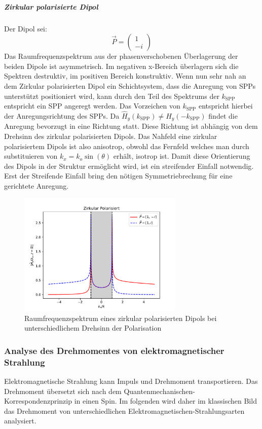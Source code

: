 \documentclass[titlepage]{article}
\begin{document}
		\subparagraph{Zirkular polarisierte Dipol}
			Der Dipol sei:
			$$\vec{P} = \begin{pmatrix} 1 \\ -i\end{pmatrix}$$
			Das Raumfrequenzspektrum aus der phasenverschobenen Überlagerung der beiden Dipole ist asymmetrisch. Im negativen x-Bereich überlagern sich die Spektren destruktiv, im positiven Bereich konstruktiv. Wenn nun sehr nah an dem Zirkular polarisierten Dipol ein Schichtsystem, dass die Anregung von SPPs unterstützt positioniert wird, kann durch den Teil des Spektrums der $k_{\mathrm{SPP}}$ entspricht ein SPP angeregt werden. Das Vorzeichen von $k_{\mathrm{SPP}}$ entspricht hierbei der Anregungsrichtung des SPPs. Da $\hat{H}_y(k_{\mathrm{SPP}}) \neq \hat{H}_y( -k_{\mathrm{SPP}}) $ findet die Anregung bevorzugt in eine Richtung statt. Diese Richtung ist abhängig von dem Drehsinn des zirkular polarisierten Dipols.			
			Das Nahfeld eine zirkular polarisiertem Dipols ist also anisotrop, obwohl das Fernfeld welches man durch substituieren von $k_x = k_o \sin(\theta)$ erhält, isotrop ist. Damit diese Orientierung des Dipols in der Struktur ermöglicht wird, ist ein streifender Einfall notwendig. Erst der Streifende Einfall bring den nötigen Symmetriebrechung für eine gerichtete Anregung.
		\begin{figure}[h]
			\centering
			\includegraphics[width=0.7\textwidth]{figures/spatial_spectrum_circ.pdf}
			\caption{Raumfrequenzspektrum eines zirkular polarisierten Dipols bei unterschiedlichem Drehsinn der Polarisation}
			\label{fig:spatial_spectrum_circ}
		\end{figure}	
		
	
		
	\subsubsection{Analyse des Drehmomentes von elektromagnetischer Strahlung}
	Elektromagnetische Strahlung kann Impuls und Drehmoment transportieren. Das Drehmoment übersetzt sich nach dem Quantenmechanischen-Korrespondenzprinzip in einen Spin. Im folgenden wird daher im klassischen Bild das Drehmoment von unterschiedlichen Elektromagnetischen-Strahlungsarten analysiert.
\end{document}
